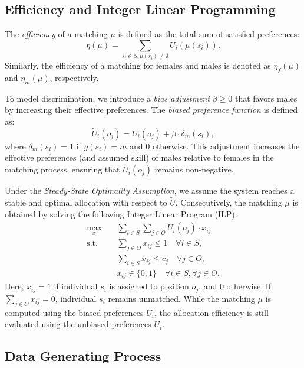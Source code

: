 \documentclass[letterpaper]{article}
\begin{document}
\subsection*{Efficiency and Integer Linear Programming}

The \textit{efficiency} of a matching \( \mu \) is defined as the total sum of satisfied preferences:
\[
\eta(\mu) = \sum_{s_i \in S, \mu(s_i) \neq \emptyset} U_i(\mu(s_i)).
\]
Similarly, the efficiency of a matching for females and males is denoted as \( \eta_f(\mu) \) and \( \eta_m(\mu) \), respectively.

To model discrimination, we introduce a \textit{bias adjustment} \( \beta \geq 0 \) that favors males by increasing their effective preferences. The \textit{biased preference function} is defined as:
\begin{equation}
\tilde{U}_i(o_j) = U_i(o_j) + \beta \cdot \delta_m(s_i),
\end{equation}
where \( \delta_m(s_i) = 1 \) if \( g(s_i) = m \) and \( 0 \) otherwise. This adjustment increases the effective preferences (and assumed skill) of males relative to females in the matching process, ensuring that \( \tilde{U}_i(o_j) \) remains non-negative.


Under the \textit{Steady-State Optimality Assumption}, we assume the system reaches a stable and optimal allocation with respect to \( \tilde{U} \). Consecutively, the matching \( \mu \) is obtained by solving the following Integer Linear Program (ILP):
\begin{align}
\max_{x} \quad & \sum_{i \in S} \sum_{j \in O} \tilde{U}_i(o_j) \cdot x_{ij} \\
\text{s.t.} \quad & \sum_{j \in O} x_{ij} \leq 1 \quad \forall i \in S, \\
& \sum_{i \in S} x_{ij} \leq c_j \quad \forall j \in O, \\
& x_{ij} \in \{0, 1\} \quad \forall i \in S, \forall j \in O.
\end{align}
Here, \( x_{ij} = 1 \) if individual \( s_i \) is assigned to position \( o_j \), and \( 0 \) otherwise. If \( \sum_{j \in O} x_{ij} = 0 \), individual \( s_i \) remains unmatched. While the matching \( \mu \) is computed using the biased preferences \( \tilde{U}_i \), the allocation efficiency is still evaluated using the unbiased preferences \( U_i \).

\subsection*{Data Generating Process}
\end{document}

